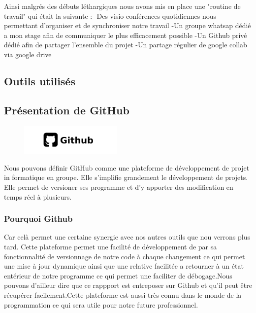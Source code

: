 {Ainsi malgrés des débuts léthargiques nous avons mis en place une "routine de travail" qui était la suivante :
-Des visio-conférences quotidiennes nous permettant d'organiser et de synchroniser notre travail
-Un groupe whatsap dédié a mon stage afin de communiquer le plus efficacement possible
-Un Github privé dédié afin de partager l'ensemble du projet
-Un partage régulier de google collab via google drive



\subsection{Outils utilisés}

\subsection{Présentation de GitHub}

\begin{figure}[h]
  \begin{center}
  \includegraphics[width=5cm]{./images/github.jpg}
  \end{center}
\end{figure}

Nous pouvons définir GitHub comme une plateforme de développement de projet in formatique en groupe. Elle s'implifie grandement le développement de projets. Elle permet de versioner ses programme et d'y apporter des modification en temps réel à plusieurs.

\subsubsection{Pourquoi Github}
Car celà permet une certaine synergie avec nos autres outils que nou verrons plus tard. Cette plateforme permet une facilité de développement de par sa fonctionnalité de versionnage de notre code à chaque changement ce qui permet une mise à jour dynamique ainsi que une relative facilitée a retourner à un état entérieur de notre programme ce qui permet une faciliter de débogage.Nous pouvons d'ailleur dire que ce rappport est entreposer sur Github et qu'il peut être récupérer facilement.Cette plateforme est aussi très connu dans le monde de la programmation ce qui sera utile pour notre future professionnel.

}
